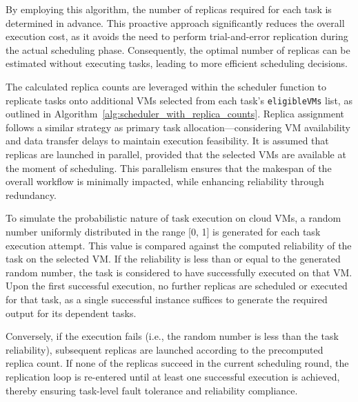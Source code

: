 \documentclass[12pt]{tcc}
\begin{document}
By employing this algorithm, the number of replicas required for each task is determined in advance. This proactive approach significantly reduces the overall execution cost, as it avoids the need to perform trial-and-error replication during the actual scheduling phase. Consequently, the optimal number of replicas can be estimated without executing tasks, leading to more efficient scheduling decisions.

The calculated replica counts are leveraged within the scheduler function to replicate tasks onto additional VMs selected from each task's \texttt{eligibleVMs} list, as outlined in Algorithm~\ref{alg:scheduler_with_replica_counts}. Replica assignment follows a similar strategy as primary task allocation—considering VM availability and data transfer delays to maintain execution feasibility. It is assumed that replicas are launched in parallel, provided that the selected VMs are available at the moment of scheduling. This parallelism ensures that the makespan of the overall workflow is minimally impacted, while enhancing reliability through redundancy.

To simulate the probabilistic nature of task execution on cloud VMs, a random number uniformly distributed in the range [0, 1] is generated for each task execution attempt. This value is compared against the computed reliability of the task on the selected VM. If the reliability is less than or equal to the generated random number, the task is considered to have successfully executed on that VM. Upon the first successful execution, no further replicas are scheduled or executed for that task, as a single successful instance suffices to generate the required output for its dependent tasks.

Conversely, if the execution fails (i.e., the random number is less than the task reliability), subsequent replicas are launched according to the precomputed replica count. If none of the replicas succeed in the current scheduling round, the replication loop is re-entered until at least one successful execution is achieved, thereby ensuring task-level fault tolerance and reliability compliance.
\end{document}
